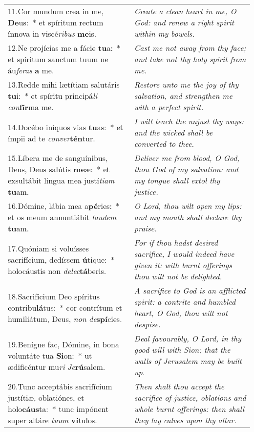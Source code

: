 \begin{longtable}{@{\hskip0pt} p{10cm} | p{6cm} @{\hskip0pt}}
11.\enspace Cor mundum crea in me, \textbf{De}us:~* et spíritum rectum ínnova in viscé\textit{ri}\textit{bus} \textbf{me}is.
 & \textit{\small Create a clean heart in me, O God: and renew a right spirit within my bowels.
}\\
12.\enspace Ne projícias me a fácie \textbf{tu}a:~* et spíritum sanctum tuum ne áu\textit{fe}\textit{ras} \textbf{a} me.
 & \textit{\small Cast me not away from thy face; and take not thy holy spirit from me.
}\\
13.\enspace Redde mihi lætítiam salutáris \textbf{tu}i:~* et spíritu principá\textit{li} \textit{con}\textbf{fír}ma me.
 & \textit{\small Restore unto me the joy of thy salvation, and strengthen me with a perfect spirit.
}\\
14.\enspace Docébo iníquos vias \textbf{tu}as:~* et ímpii ad te \textit{con}\textit{ver}\textbf{tén}tur.
 & \textit{\small I will teach the unjust thy ways: and the wicked shall be converted to thee.
}\\
15.\enspace Líbera me de sanguínibus, Deus, Deus salútis \textbf{me}æ:~* et exsultábit lingua mea justí\textit{ti}\textit{am} \textbf{tu}am.
 & \textit{\small Deliver me from blood, O God, thou God of my salvation: and my tongue shall extol thy justice.
}\\
16.\enspace Dómine, lábia mea a\textbf{pé}ries:~* et os meum annuntiábit \textit{lau}\textit{dem} \textbf{tu}am.
 & \textit{\small O Lord, thou wilt open my lips: and my mouth shall declare thy praise.
}\\
17.\enspace Quóniam si voluísses sacrifícium, dedíssem \textbf{ú}tique:~* holocáustis non \textit{de}\textit{lec}\textbf{tá}beris.
 & \textit{\small For if thou hadst desired sacrifice, I would indeed have given it: with burnt offerings thou wilt not be delighted.
}\\
18.\enspace Sacrifícium Deo spíritus contribu\textbf{lá}tus:~* cor contrítum et humiliátum, Deus, \textit{non} \textit{de}\textbf{spí}cies.
 & \textit{\small A sacrifice to God is an afflicted spirit: a contrite and humbled heart, O God, thou wilt not despise.
}\\
19.\enspace Benígne fac, Dómine, in bona voluntáte tua \textbf{Si}on:~* ut ædificéntur mu\textit{ri} \textit{Je}\textbf{rú}salem.
 & \textit{\small Deal favourably, O Lord, in thy good will with Sion; that the walls of Jerusalem may be built up.
}\\
20.\enspace Tunc acceptábis sacrifícium justítiæ, oblatiónes, et holo\textbf{cáus}ta:~* tunc impónent super altáre \textit{tu}\textit{um} \textbf{ví}tulos. & \textit{\small Then shalt thou accept the sacrifice of justice, oblations and whole burnt offerings: then shall they lay calves upon thy altar.}\\
\end{longtable}